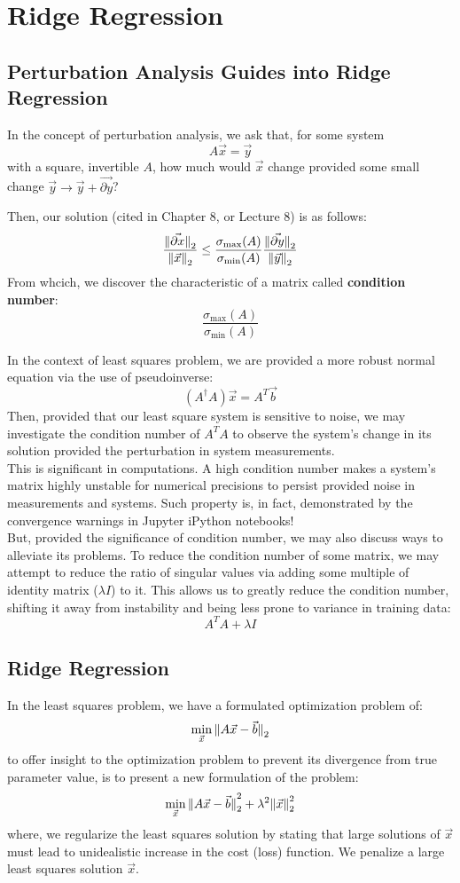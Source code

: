 \chapter{Ridge Regression}

\section{Perturbation Analysis Guides into Ridge Regression}
In the concept of perturbation analysis, we ask that, for some system
\[A \vec{x} = \vec{y}\]
with a square, invertible $A$, how much would $\vec{x}$ change provided some small change $\vec{y} \rightarrow \vec{y} + \vec{\partial y}$?

Then, our solution (cited in Chapter 8, or Lecture 8) is as follows:
\[
    \frac{\pnorm{\vec{\partial x}}{2}}{\pnorm{\vec{x}}{2}} \leq \frac{\sigma_{\max}(A)}{\sigma_{\min}(A)} \frac{\pnorm{\vec{\partial y}}{2}}{\pnorm{\vec{y}}{2}}
\]
From whcich, we discover the characteristic of a matrix called \textbf{condition number}:
\[\frac{\sigma_{\max}(A)}{\sigma_{\min}(A)}\]

In the context of least squares problem, we are provided a more robust normal equation via the use of pseudoinverse:
\[
    (A^\dagger A) \vec{x} = A^T \vec{b}
\]
Then, provided that our least square system is sensitive to noise, we may investigate the condition number of $A^T A$ to observe the system's change in its solution provided the perturbation in system measurements. \\
This is significant in computations. A high condition number makes a system's matrix highly unstable for numerical precisions to persist provided noise in measurements and systems.
Such property is, in fact, demonstrated by the convergence warnings in Jupyter iPython notebooks! \\
But, provided the significance of condition number, we may also discuss ways to alleviate its problems.
To reduce the condition number of some matrix, we may attempt to reduce the ratio of singular values via adding some multiple of identity matrix ($\lambda I$) to it.
This allows us to greatly reduce the condition number, shifting it away from instability and being less prone to variance in training data:
\[A^T A + \lambda I\]

\section{Ridge Regression}
In the least squares problem, we have a formulated optimization problem of:
\[
    \min_{\vec{x}} \pnorm{A \vec{x} - \vec{b}}{2}
\]
to offer insight to the optimization problem to prevent its divergence from true parameter value, is to present a new formulation of the problem:
\[
    \min_{\vec{x}} \pnorm[2]{A \vec{x} - \vec{b}}{2} + \lambda^2 \pnorm[2]{\vec{x}}{2}
\]
where, we regularize the least squares solution by stating that large solutions of $\vec{x}$ must lead to unidealistic increase in the cost (loss) function.
We penalize a large least squares solution $\vec{x}$.

